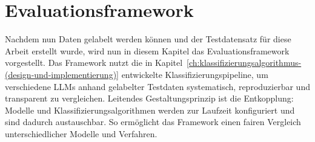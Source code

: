 
\chapter{Evaluationsframework}\label{ch:evaluationsframework}

Nachdem nun Daten gelabelt werden können und der Testdatensatz für diese Arbeit erstellt wurde, wird nun in diesem Kapitel das Evaluationsframework vorgestellt. Das Framework nutzt die in Kapitel~\ref{ch:klassifizierungsalgorithmus-(design-und-implementierung)} entwickelte Klassifizierungspipeline, um verschiedene \acp{LLM} anhand gelabelter Testdaten systematisch, reproduzierbar und transparent zu vergleichen. Leitendes Gestaltungsprinzip ist die Entkopplung: Modelle und Klassifizierungsalgorithmen werden zur Laufzeit konfiguriert und sind dadurch austauschbar. So ermöglicht das Framework einen fairen Vergleich unterschiedlicher Modelle und Verfahren.







